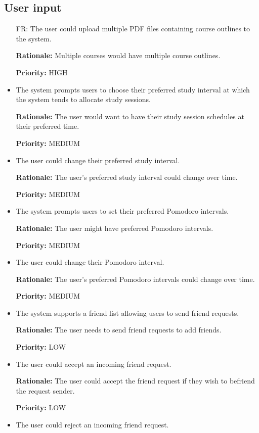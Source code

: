 \documentclass[12pt]{article}
\newcounter{reqnum} %
\newcommand{\rthereqnum}{FR\refstepcounter{reqnum}\thereqnum:}
\begin{document}
\subsection{User input}
\begin{itemize}[leftmargin=16.5mm,labelsep=4mm,label=\rthereqnum]

\item[\rthereqnum \label{R_upload_pdf}]
The user could upload multiple PDF files containing course outlines to the system.

\textbf{Rationale:} Multiple courses would have multiple course outlines.

\textbf{Priority:} HIGH
\item
The system prompts users to choose their preferred study interval at which the system tends to allocate study sessions.

\textbf{Rationale:} The user would want to have their study session schedules at their preferred time.

\textbf{Priority:} MEDIUM
\item
The user could change their preferred study interval.

\textbf{Rationale:} The user's preferred study interval could change over time. 

\textbf{Priority:} MEDIUM
\item
The system prompts users to set their preferred Pomodoro intervals. 

\textbf{Rationale:} The user might have preferred Pomodoro intervals.

\textbf{Priority:} MEDIUM
\item
The user could change their Pomodoro interval.

\textbf{Rationale:} The user's preferred Pomodoro intervals could change over time.

\textbf{Priority:} MEDIUM
\item
The system supports a friend list allowing users to send friend requests.

\textbf{Rationale:} The user needs to send friend requests to add friends.

\textbf{Priority:} LOW
\item
The user could accept an incoming friend request.

\textbf{Rationale:} The user could accept the friend request if they wish to befriend the request sender.

\textbf{Priority:} LOW
\item
The user could reject an incoming friend request.


\end{itemize}
\end{document}
